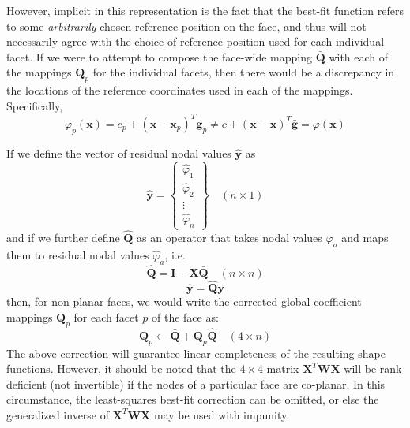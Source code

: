 \documentclass[11pt]{article} %
\begin{document}
However, implicit in this representation is the fact that the best-fit function refers to some \textit{arbitrarily} chosen reference position on the face, and thus will not necessarily agree with the choice of reference position used for each individual facet. If we were to attempt to compose the face-wide mapping $\bar{\mathbf{Q}}$ with each of the mappings $\mathbf{Q}_p$ for the individual facets, then there would be a discrepancy in the locations of the reference coordinates used in each of the mappings. Specifically, 
\begin{equation}
	\varphi_p (\mathbf{x}) = c_p + (\mathbf{x} - \mathbf{x}_p)^T \mathbf{g}_p \neq \bar{c} + (\mathbf{x} - \bar{\mathbf{x}})^T \bar{\mathbf{g}} = \bar{\varphi} (\mathbf{x})
\end{equation}

If we define the vector of residual nodal values $\hat{\mathbf{y}}$ as
\begin{equation}
	\hat{\mathbf{y}} = \left\{ \begin{array}{c} \hat{\varphi}_1 \\ \hat{\varphi}_2 \\ \vdots \\ \hat{\varphi}_n \end{array} \right\} \quad (n \times 1)
\end{equation}
and if we further define $\hat{\mathbf{Q}}$ as an operator that takes nodal values $\varphi_a$ and maps them to residual nodal values $\hat{\varphi}_a$, i.e.
\begin{equation}
	\hat{\mathbf{Q}} = \mathbf{I} - \mathbf{X} \bar{\mathbf{Q}} \quad (n \times n)
\end{equation}
\begin{equation}
	\hat{\mathbf{y}} = \hat{\mathbf{Q}} \mathbf{y}
\end{equation}
then, for non-planar faces, we would write the corrected global coefficient mappings $\mathbf{Q}_p$ for each facet $p$ of the face as:
\begin{equation}
	\mathbf{Q}_p \leftarrow \bar{\mathbf{Q}} + \mathbf{Q}_p \hat{\mathbf{Q}} \quad (4 \times n)
\end{equation}
The above correction will guarantee linear completeness of the resulting shape functions. However, it should be noted that the $4 \times 4$ matrix $\mathbf{X}^T \mathbf{W} \mathbf{X}$ will be rank deficient (not invertible) if the nodes of a particular face are co-planar. In this circumstance, the least-squares best-fit correction can be omitted, or else the generalized inverse of $\mathbf{X}^T \mathbf{W} \mathbf{X}$ may be used with impunity.
\end{document}
